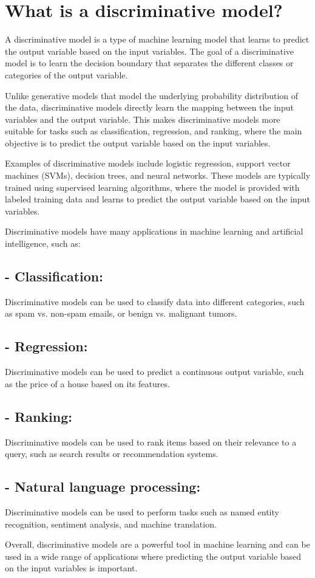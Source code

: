 \section{What is a discriminative model?}
A discriminative model is a type of machine learning model that learns to predict the output variable based on the input variables. The goal of a discriminative model is to learn the decision boundary that separates the different classes or categories of the output variable.

Unlike generative models that model the underlying probability distribution of the data, discriminative models directly learn the mapping between the input variables and the output variable. This makes discriminative models more suitable for tasks such as classification, regression, and ranking, where the main objective is to predict the output variable based on the input variables.

Examples of discriminative models include logistic regression, support vector machines (SVMs), decision trees, and neural networks. These models are typically trained using supervised learning algorithms, where the model is provided with labeled training data and learns to predict the output variable based on the input variables.

Discriminative models have many applications in machine learning and artificial intelligence, such as:

\subsection{- Classification:}  Discriminative models can be used to classify data into different categories, such as spam vs. non-spam emails, or benign vs. malignant tumors.

\subsection{- Regression:}  Discriminative models can be used to predict a continuous output variable, such as the price of a house based on its features.

\subsection{- Ranking:}  Discriminative models can be used to rank items based on their relevance to a query, such as search results or recommendation systems.

\subsection{- Natural language processing:}  Discriminative models can be used to perform tasks such as named entity recognition, sentiment analysis, and machine translation.

Overall, discriminative models are a powerful tool in machine learning and can be used in a wide range of applications where predicting the output variable based on the input variables is important.


